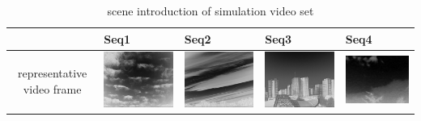 \documentclass[journal]{IEEEtran}
\begin{document}
\begin{table}[t]
  \centering
  \caption{scene introduction of simulation video set}
  \label{tab1}
  \begin{tabular}{|c|m{3cm}<{\centering}|m{3cm}<{\centering}|m{3cm}<{\centering}|m{3.2cm}<{\centering}|}
    \hline
    &Seq1 &Seq2 &Seq3 &Seq4\\
    \hline
    representative video frame& \includegraphics[scale=0.33]{back1.png}& \includegraphics[scale=0.25]{back2.png}& \includegraphics[scale=0.33]{back3.png}& \includegraphics[scale=0.3]{back4.png}\\

\end{tabular}
\end{table}
\end{document}
